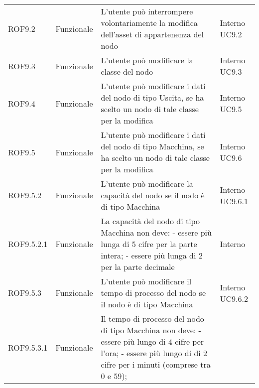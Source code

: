 \begin{longtable}{p{2cm}!{\VRule[1pt]}p{2cm}!{\VRule[1pt]}p{5cm}!{\VRule[1pt]}p{1.5cm}}
	ROF9.2                           & Funzionale\newline               & L'utente può interrompere volontariamente la modifica dell'asset di appartenenza del nodo                                & Interno \newline UC9.2       
	\\
	ROF9.3                           & Funzionale\newline               & L'utente può modificare la classe del nodo                                                                               & Interno \newline UC9.3       
	\\
	ROF9.4                           & Funzionale\newline               & L'utente può modificare i dati del nodo di tipo Uscita, se ha scelto un nodo di tale classe per la modifica              & Interno \newline UC9.5       
	\\
	ROF9.5                           & Funzionale\newline               & L'utente può modificare i dati del nodo di tipo Macchina, se ha scelto un nodo di tale classe per la modifica            & Interno \newline UC9.6       
	\\
	ROF9.5.2                         & Funzionale\newline               & L'utente può modificare la capacità  del nodo se il nodo è di tipo Macchina                                            & Interno \newline UC9.6.1     
	\\
	ROF9.5.2.1&Funzionale\newline  & La capacità del nodo di tipo Macchina non deve:
	- essere più lunga di 5 cifre per la parte intera;
	- essere più lunga di 2 per la parte decimale & Interno \\
	ROF9.5.3                         & Funzionale\newline               & L'utente può modificare il tempo di processo del nodo se il nodo è di tipo Macchina                                     & Interno \newline UC9.6.2     
	\\
	ROF9.5.3.1&Funzionale\newline  & Il tempo di processo del nodo di tipo Macchina non deve:
	- essere più lungo di 4 cifre per l'ora;
	- essere più lungo di di 2 cifre per i minuti (comprese tra 0 e 59);

\end{longtable}
